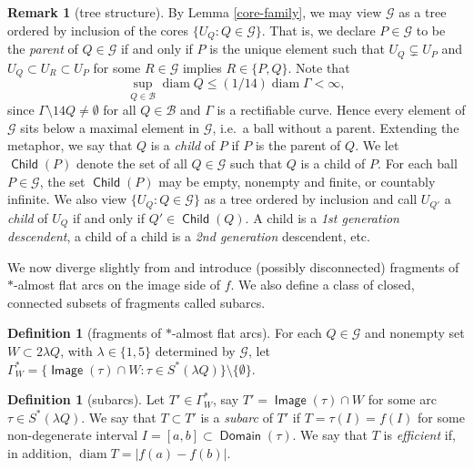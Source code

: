 \documentclass[12pt]{amsart}
\numberwithin{equation}{section}
\theoremstyle{plain}
\theoremstyle{definition}
\newtheorem{remark}[theorem]{Remark}
\newtheorem{definition}[theorem]{Definition}
\newcommand{\diam}{\mathop\mathrm{diam}\nolimits}
\newcommand{\Domain}{\mathop\mathsf{Domain}\nolimits}
\newcommand{\Image}{\mathop\mathsf{Image}\nolimits}
\newcommand{\Child}{\mathop\mathsf{Child}\nolimits}
\numberwithin{figure}{section}
\begin{document}
\begin{remark}[tree structure] \label{r:G is a tree} By Lemma \ref{core-family}, we may view $\mathscr{G}$ as a tree ordered by inclusion of the cores $\{U_Q:Q\in\mathscr{G}\}$. That is, we declare $P\in\mathscr{G}$ to be the \emph{parent} of $Q\in\mathscr{G}$ if and only if $P$ is the unique element such that $U_Q\subsetneq U_P$ and $U_Q\subset U_{R}\subset U_P$ for some $R\in\mathscr{G}$ implies $R\in\{P,Q\}$. Note that \begin{equation}\label{max-scale}\sup_{Q\in\mathscr{B}} \diam Q\leq (1/14)\diam \Gamma<\infty,\end{equation} since $\Gamma\setminus 14Q\neq\emptyset$ for all $Q\in\mathscr{B}$ and $\Gamma$ is a rectifiable curve. Hence every element of $\mathscr{G}$ sits below a maximal element in $\mathscr{G}$, i.e.~a ball without a parent. Extending the metaphor, we say that $Q$ is a \emph{child} of $P$ if $P$ is the parent of $Q$. We let $\Child(P)$ denote the set of all $Q\in\mathscr{G}$ such that $Q$ is a child of $P$. For each ball $P\in\mathscr{G}$, the set $\Child(P)$ may be empty, nonempty and finite, or countably infinite.
We also view $\{U_Q:Q\in\mathscr{G}\}$ as a tree ordered by inclusion and call $U_{Q'}$ a \emph{child} of $U_{Q}$ if and only if $Q'\in\Child(Q)$. A child is a \emph{1st generation descendent}, a child of a child is a \emph{2nd generation} descendent, etc.
\end{remark}

We now diverge slightly from \cite{Schul-Hilbert} and introduce (possibly disconnected) fragments of $*$-almost flat arcs on the image side of $f$. We also define a class of closed, connected subsets of fragments called subarcs.

\begin{definition}[fragments of $*$-almost flat arcs] \label{def:arc-fragments} For each $Q\in\mathscr{G}$ and nonempty set $W\subset 2\lambda Q$, with $\lambda\in\{1,5\}$ determined by $\mathscr{G}$, let $\Gamma^*_W=\{\Image(\tau)\cap W:\tau\in S^*(\lambda Q)\}\setminus\{\emptyset\}$.\end{definition}

\begin{definition}[subarcs] \label{def:subarc} Let $T'\in\Gamma^*_W$, say $T'=\Image(\tau)\cap W$ for some arc $\tau\in S^*(\lambda Q)$. We say that $T\subset T'$ is a \emph{subarc} of $T'$ if $T=\tau(I)=f(I)$ for some non-degenerate interval $I=[a,b]\subset\Domain(\tau)$. We say that $T$ is \emph{efficient} if, in addition, $\diam T=|f(a)-f(b)|$.\end{definition}
\end{document}
